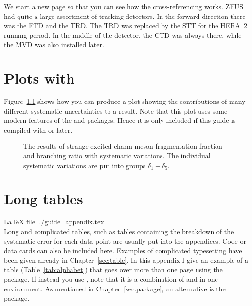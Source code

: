 We start a new page so that you can see how the cross-referencing
works.  ZEUS had quite a large assortment of tracking detectors. In the
forward direction there was the \gls{FTD} and the \gls{TRD}. The
\gls{TRD} was replaced by the \gls{STT} for the HERA~2 running
period.  In the middle of the detector, the \gls{CTD} was always
there, while the \gls{MVD} was also installed later.


\chapter{Plots with \Package{\TikZ}}
\label{sec:app:tikz}

Figure~\ref{fig:tikz:syst} shows how you can produce a plot showing
the contributions of many different systematic uncertainties to a
result. Note that this plot uses some modern features of
the  and  packages. Hence it is only included if
this guide is compiled with  or later.


\begin{figure}[htbp]
  \centering
   {%
  }{%
    
  }
  \caption[Strange $D^{**}$ systematics, fragmentation fractions]{The
    results of strange excited charm meson fragmentation fraction and
    branching ratio with systematic variations.  The individual
    systematic variations are put into groups $\delta_1-\delta_5$.}
  \label{fig:tikz:syst}
\end{figure}


\chapter{Long tables}
\label{sec:app:tables}

\LaTeX{} file: \url{./guide_appendix.tex}\\[1ex]
\noindent
Long and complicated tables, such as tables containing the breakdown
of the systematic error for each data point are usually put into the
appendices. Code or data cards can also be included here.  Examples of
complicated typesetting have been given already in
Chapter~\ref{sec:table}. In this appendix I give an example of a table
(Table~\ref{tab:alphabet}) that goes over more than one page using the
 package. If instead you use ,
note that it is a
combination of  and  in one
environment. 
As mentioned in Chapter~\ref{sec:package}, an alternative
is the  package.
 
